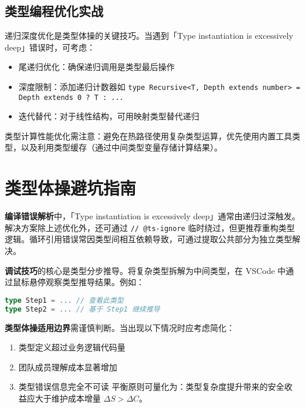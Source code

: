 \section{类型编程优化实战}
递归深度优化是类型体操的关键技巧。当遇到「Type instantiation is excessively deep」错误时，可考虑：\par
\begin{itemize}
\item 尾递归优化：确保递归调用是类型最后操作
\item 深度限制：添加递归计数器如 \texttt{type Recursive<T, Depth extends number> = Depth extends 0 ? T : ...}
\item 迭代替代：对于线性结构，可用映射类型替代递归
\end{itemize}
类型计算性能优化需注意：避免在热路径使用复杂类型运算，优先使用内置工具类型，以及利用类型缓存（通过中间类型变量存储计算结果）。\par
\chapter{类型体操避坑指南}
\textbf{编译错误解析}中，「Type instantiation is excessively deep」通常由递归过深触发。解决方案除上述优化外，还可通过 \texttt{// @ts-ignore} 临时绕过，但更推荐重构类型逻辑。循环引用错误常因类型间相互依赖导致，可通过提取公共部分为独立类型解决。\par
\textbf{调试技巧}的核心是类型分步推导。将复杂类型拆解为中间类型，在 VSCode 中通过鼠标悬停观察类型推导结果。例如：\par
\begin{lstlisting}[language=typescript]
type Step1 = ... // 查看此类型
type Step2 = ... // 基于 Step1 继续推导
\end{lstlisting}
\textbf{类型体操适用边界}需谨慎判断。当出现以下情况时应考虑简化：\par
\begin{enumerate}
\item 类型定义超过业务逻辑代码量
\item 团队成员理解成本显著增加
\item 类型错误信息完全不可读
平衡原则可量化为：类型复杂度提升带来的安全收益应大于维护成本增量 $\Delta S > \Delta C$。
\end{enumerate}
